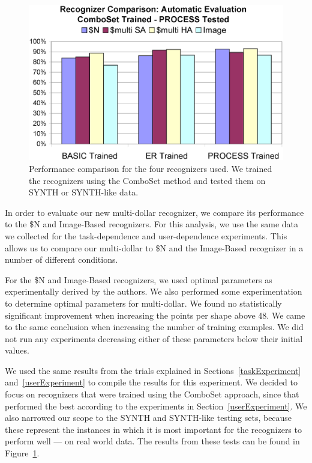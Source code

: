 \documentclass[final,5p,twocolumn]{elsarticle}
\begin{document}
\begin{figure}
\begin{center}
\includegraphics[width=\hsize]{RecComparisonAutoPROCESS.eps}
\end{center}
\caption{Performance comparison for the four recognizers used.  We trained the recognizers using the ComboSet method and tested them on SYNTH or SYNTH-like data.}
\label{RecComparison}
\end{figure}

In order to evaluate our new multi-dollar recognizer, we compare its performance to the \$N 
and Image-Based recognizers.  For this analysis, we use the same data we collected for the task-dependence and user-dependence experiments.  This allows us to compare our multi-dollar to \$N and the Image-Based recognizer in a number of different conditions.

For the \$N and Image-Based recognizers, we used optimal parameters as experimentally derived by the authors. We also performed some experimentation to determine optimal parameters for multi-dollar. We found no statistically significant improvement when increasing the points per shape above 48.  We came to the same conclusion when increasing the number of training examples.  We did not run any experiments decreasing either of these parameters below their initial values.

We used the same results from the trials explained in Sections~\ref{taskExperiment} and~\ref{userExperiment} to compile the results for this experiment.  We decided to focus on recognizers that were trained using the ComboSet approach, since that performed the best according to the experiments in Section~\ref{userExperiment}.  We also narrowed our scope to the SYNTH and SYNTH-like testing sets, because these represent the instances in which it is most important for the recognizers to perform well --- on real world data.  The results from these tests can be found in Figure~\ref{RecComparison}.
\end{document}
